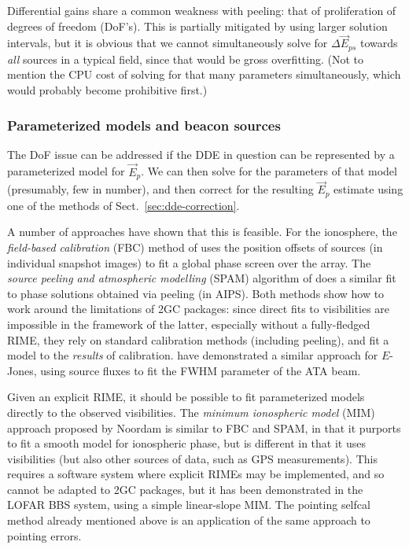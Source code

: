 \documentclass[referee]{aa}
\newcommand{\jones}[2]{\vec {#1}_{#2}}
\begin{document}
Differential gains share a common weakness with peeling: that of proliferation of degrees of freedom (DoF's). This is partially mitigated by using larger solution intervals, but it is obvious that we cannot simultaneously solve for $\Delta\jones{E}{ps}$ towards \emph{all} sources in a typical field, since that would be gross overfitting. (Not to mention the CPU cost of solving for that many parameters simultaneously, which would probably become prohibitive first.) 

\subsubsection{Parameterized models and beacon sources}

The DoF issue can be addressed if the DDE in question can be represented by a parameterized model for $\jones{E}{p}$. We can then solve for the parameters of that model (presumably, few in number), and then correct for the resulting $\jones{E}{p}$ estimate using one of the methods of Sect.~\ref{sec:dde-correction}. 

A number of approaches have shown that this is feasible. For the ionosphere, the \emph{field-based calibration} (FBC) method of \citet{Cotton:FBC} uses the position offsets of sources (in individual snapshot images) to fit a global phase screen over the array. The \emph{source peeling and atmospheric modelling} (SPAM) algorithm of \citet{Intema:SPAM} does a similar fit to phase solutions obtained via peeling (in AIPS). Both methods show how to work around the limitations of 2GC packages: since direct fits to visibilities are impossible in the framework of the latter, especially without a fully-fledged RIME, they rely on standard calibration methods (including peeling), and fit a model to the \emph{results} of calibration. \citet{Hull:ata-beam-fitting} have demonstrated a similar approach for $E$-Jones, using source fluxes to fit the FWHM parameter of the ATA beam. 

Given an explicit RIME, it should be possible to fit parameterized models directly to the observed visibilities. The \emph{minimum ionospheric model} (MIM) approach proposed by Noordam is similar to FBC and SPAM, in that it purports to fit a smooth model for ionospheric phase, but is different in that it uses visibilities (but also other sources of data, such as GPS measurements). This requires a software system where explicit RIMEs may be implemented, and so cannot be adapted to 2GC packages, but it has been demonstrated in the LOFAR BBS system, using a simple linear-slope MIM. The pointing selfcal method \citep{SB:pointing} already mentioned above is an application of the same approach to pointing errors.
\end{document}
